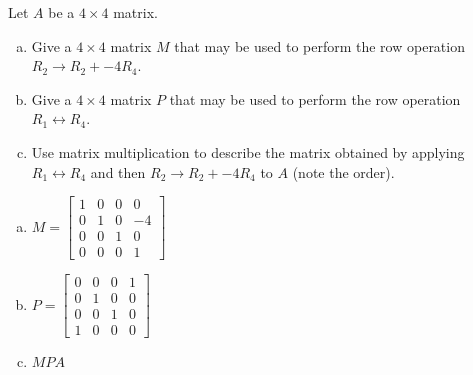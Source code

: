 
\begin{exerciseStatement}


Let \(A\) be a \(4 \times 4\) matrix.


\begin{enumerate}[(a)]
\item Give a \(4 \times 4\) matrix \(M\) that may be used to perform the row operation \( R_2 \to R_2 + -4R_4 \).
\item Give a \(4 \times 4\) matrix \(P\) that may be used to perform the row operation \( R_1 \leftrightarrow R_4 \).
\item Use matrix multiplication to describe the matrix obtained by applying \( R_1 \leftrightarrow R_4 \) and then \( R_2 \to R_2 + -4R_4 \) to \(A\) (note the order). 
\end{enumerate}
    
\end{exerciseStatement}
    
\begin{exerciseAnswer} 

\begin{enumerate}[(a)]
\item \(M= \left[\begin{array}{cccc}
1 & 0 & 0 & 0 \\
0 & 1 & 0 & -4 \\
0 & 0 & 1 & 0 \\
0 & 0 & 0 & 1
\end{array}\right] \)
\item \(P= \left[\begin{array}{cccc}
0 & 0 & 0 & 1 \\
0 & 1 & 0 & 0 \\
0 & 0 & 1 & 0 \\
1 & 0 & 0 & 0
\end{array}\right] \)
\item \(MPA\)
\end{enumerate}
    
\end{exerciseAnswer}
    
